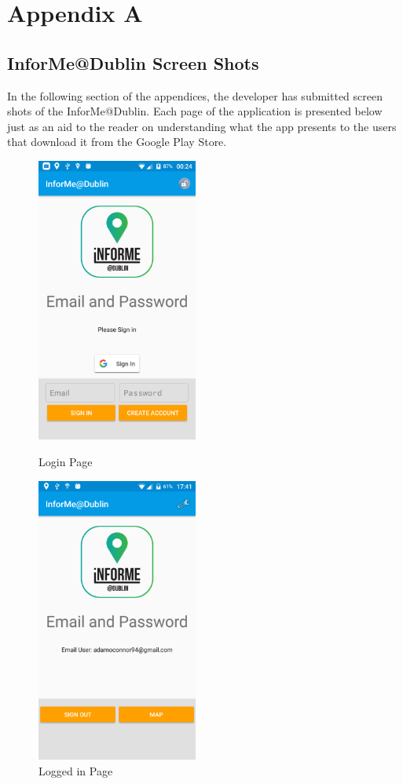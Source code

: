 \chapter{Appendix A}

\section{InforMe@Dublin Screen Shots}
In the following section of the appendices, the developer has submitted screen shots of the InforMe@Dublin. Each page of the application is presented below just as an aid to the reader on understanding what the app presents to the users that download it from the Google Play Store.

\begin{figure}[!tbp]
	\centering
	\begin{minipage}[b]{0.4\textwidth}
		\includegraphics[width=150pt]{Login-Page}
		\caption{Login Page}
		\label{Figure: Login Page}
	\end{minipage}
	\hfill
	\begin{minipage}[b]{0.4\textwidth}
		\includegraphics[width=150pt]{LoggedIn-Page}
		\caption{Logged in Page} 
		\label{Figure: Logged in Page}
	\end{minipage}
\end{figure}

